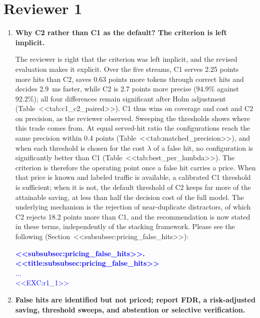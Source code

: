 \documentclass[11pt]{article}
\begin{document}
\section*{Reviewer 1}

\begin{enumerate}[leftmargin=*, itemsep=1.2em]

\item \textbf{Why C2 rather than C1 as the default? The criterion is left implicit.}

The reviewer is right that the criterion was left implicit, and the revised evaluation makes it explicit. Over the five streams, C1 serves 2.25 points more hits than C2, saves 0.63 points more tokens through correct hits and decides 2.9~ms faster, while C2 is 2.7 points more precise (94.9\% against 92.2\%); all four differences remain significant after Holm adjustment (Table~<<tab:c1_c2_paired>>). C1 thus wins on coverage and cost and C2 on precision, as the reviewer observed. Sweeping the thresholds shows where this trade comes from. At equal served-hit ratio the configurations reach the same precision within 0.4 points (Table~<<tab:matched_precision>>), and when each threshold is chosen for the cost $\lambda$ of a false hit, no configuration is significantly better than C1 (Table~<<tab:best_per_lambda>>). The criterion is therefore the operating point once a false hit carries a price. When that price is known and labeled traffic is available, a calibrated C1 threshold is sufficient; when it is not, the default threshold of C2 keeps far more of the attainable saving, at less than half the decision cost of the full model. The underlying mechanism is the rejection of near-duplicate distractors, of which C2 rejects 18.2 points more than C1, and the recommendation is now stated in these terms, independently of the stacking framework. Please see the following (Section~<<subsubsec:pricing_false_hits>>):

\textcolor{blue}{\textbf{<<subsubsec:pricing_false_hits>>. <<title:subsubsec:pricing_false_hits>>}\\
...\\
<<EXC:r1_1>>}

\item \textbf{False hits are identified but not priced; report FDR, a risk-adjusted saving, threshold sweeps, and abstention or selective verification.}


\end{enumerate}
\end{document}
